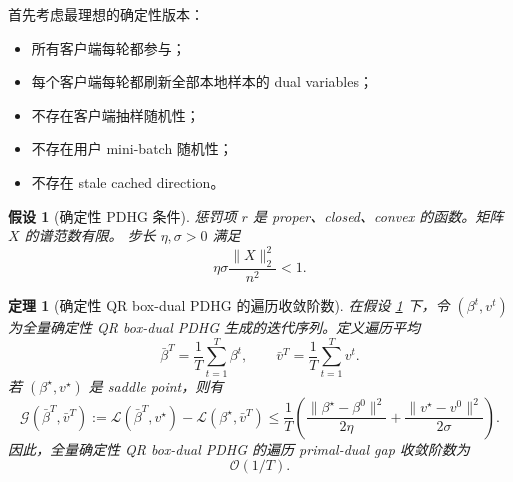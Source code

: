 \documentclass[UTF8,a4paper,11pt]{ctexart}
\newtheorem{theorem}{定理}
\newtheorem{assumption}{假设}
\begin{document}
首先考虑最理想的确定性版本：

\begin{itemize}[leftmargin=2em]
    \item 所有客户端每轮都参与；
    \item 每个客户端每轮都刷新全部本地样本的 dual variables；
    \item 不存在客户端抽样随机性；
    \item 不存在用户 mini-batch 随机性；
    \item 不存在 stale cached direction。
\end{itemize}

\begin{assumption}[确定性 PDHG 条件]
\label{assump:det}
惩罚项 $r$ 是 proper、closed、convex 的函数。矩阵 $X$ 的谱范数有限。
步长 $\eta,\sigma>0$ 满足
\begin{equation}
    \eta\sigma \frac{\|X\|_2^2}{n^2}<1 .
    \label{eq:stepsize}
\end{equation}
\end{assumption}

\begin{theorem}[确定性 QR box-dual PDHG 的遍历收敛阶数]
\label{thm:det}
在假设 \ref{assump:det} 下，令 $(\beta^t,v^t)$ 为全量确定性 QR box-dual PDHG
生成的迭代序列。定义遍历平均
\[
    \bar{\beta}^T
    =
    \frac{1}{T}\sum_{t=1}^T\beta^t,
    \qquad
    \bar{v}^T
    =
    \frac{1}{T}\sum_{t=1}^Tv^t.
\]
若 $(\beta^\star,v^\star)$ 是 saddle point，则有
\begin{equation}
    \mathcal{G}(\bar{\beta}^T,\bar{v}^T)
    :=
    \mathcal{L}(\bar{\beta}^T,v^\star)
    -
    \mathcal{L}(\beta^\star,\bar{v}^T)
    \le
    \frac{1}{T}
    \left(
        \frac{\|\beta^\star-\beta^0\|^2}{2\eta}
        +
        \frac{\|v^\star-v^0\|^2}{2\sigma}
    \right).
    \label{eq:det-rate}
\end{equation}
因此，全量确定性 QR box-dual PDHG 的遍历 primal-dual gap 收敛阶数为
\[
    \mathcal{O}(1/T).
\]
\end{theorem}
\end{document}
